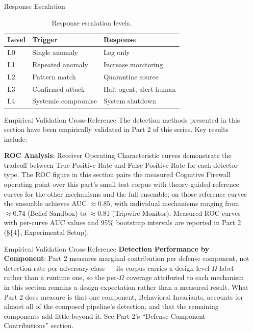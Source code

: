 \documentclass[
  ignorenonframetext,
]{beamer}
\begin{document}
\begin{frame}[allowframebreaks]{Response Escalation}
\begin{table}[htbp]
\centering
\caption{Response escalation levels.}
\label{tab:alert-escalation}
\begin{tabular}{@{}llp{4cm}@{}}
\toprule
Level & Trigger & Response \\
\midrule
L0 & Single anomaly & Log only \\
L1 & Repeated anomaly & Increase monitoring \\
L2 & Pattern match & Quarantine source \\
L3 & Confirmed attack & Halt agent, alert human \\
L4 & Systemic compromise & System shutdown \\
\bottomrule
\end{tabular}
\end{table}
\end{frame}

\begin{frame}[allowframebreaks]{Empirical Validation Cross-Reference}
\protect{}\label{empirical-validation-cross-reference}
The detection methods presented in this section have been empirically
validated in Part 2 of this series. Key results include:

\textbf{ROC Analysis}: Receiver Operating Characteristic curves
demonstrate the tradeoff between True Positive Rate and False Positive
Rate for each detector type. The ROC figure in this section pairs the
measured Cognitive Firewall operating point over this part's small test
corpus with theory-guided reference curves for the other mechanisms and
the full ensemble; on those reference curves the ensemble achieves AUC
\(\approx 0.85\), with individual mechanisms ranging from
\(\approx 0.74\) (Belief Sandbox) to \(\approx 0.81\) (Tripwire
Monitor). Measured ROC curves with per-curve AUC values and 95\%
bootstrap intervals are reported in Part 2 (\S\{4\}, Experimental
Setup).

\end{frame}

\begin{frame}[allowframebreaks]{Empirical Validation Cross-Reference}
\textbf{Detection Performance by Component}: Part 2 measures marginal
contribution per defense component, not detection rate per adversary
class --- its corpus carries a design-level \(\Omega\) label rather than
a runtime one, so the per-\(\Omega\) coverage attributed to each
mechanism in this section remains a design expectation rather than a
measured result. What Part 2 does measure is that one component,
Behavioral Invariants, accounts for almost all of the composed
pipeline's detection, and that the remaining components add little
beyond it. See Part 2's ``Defense Component Contributions'' section.

\end{frame}
\end{document}
